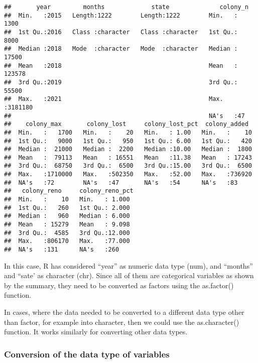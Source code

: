\documentclass[
]{article}
\newenvironment{Shaded}{\begin{snugshade}}{\end{snugshade}}
\newcommand{\FunctionTok}[1]{\textcolor[rgb]{0.13,0.29,0.53}{\textbf{#1}}}
\newcommand{\NormalTok}[1]{#1}
\newcommand{\OtherTok}[1]{\textcolor[rgb]{0.56,0.35,0.01}{#1}}
\newcommand{\SpecialCharTok}[1]{\textcolor[rgb]{0.81,0.36,0.00}{\textbf{#1}}}
\begin{document}
\begin{verbatim}
##       year         months             state              colony_n      
##  Min.   :2015   Length:1222        Length:1222        Min.   :   1300  
##  1st Qu.:2016   Class :character   Class :character   1st Qu.:   8000  
##  Median :2018   Mode  :character   Mode  :character   Median :  17500  
##  Mean   :2018                                         Mean   : 123578  
##  3rd Qu.:2019                                         3rd Qu.:  55500  
##  Max.   :2021                                         Max.   :3181180  
##                                                       NA's   :47       
##    colony_max       colony_lost     colony_lost_pct  colony_added   
##  Min.   :   1700   Min.   :    20   Min.   : 1.00   Min.   :    10  
##  1st Qu.:   9000   1st Qu.:   950   1st Qu.: 6.00   1st Qu.:   420  
##  Median :  21000   Median :  2200   Median :10.00   Median :  1800  
##  Mean   :  79113   Mean   : 16551   Mean   :11.38   Mean   : 17243  
##  3rd Qu.:  68750   3rd Qu.:  6500   3rd Qu.:15.00   3rd Qu.:  6500  
##  Max.   :1710000   Max.   :502350   Max.   :52.00   Max.   :736920  
##  NA's   :72        NA's   :47       NA's   :54      NA's   :83      
##   colony_reno     colony_reno_pct 
##  Min.   :    10   Min.   : 1.000  
##  1st Qu.:   260   1st Qu.: 2.000  
##  Median :   960   Median : 6.000  
##  Mean   : 15279   Mean   : 9.098  
##  3rd Qu.:  4585   3rd Qu.:12.000  
##  Max.   :806170   Max.   :77.000  
##  NA's   :131      NA's   :260
\end{verbatim}

In this case, R has considered ``year'' as numeric data type (num), and
``months'' and ``sate' as character (chr). Since all of them are
categorical variables as shown by the summary, they need to be converted
as factors using the as.factor() function.

In cases, where the data needed to be converted to a different data type
other than factor, for example into character, then we could use the
as.character() function. It works similarly for converting other data
types.

\subsubsection{Conversion of the data type of
variables}\label{conversion-of-the-data-type-of-variables}

\begin{Shaded}
\end{Shaded}
\end{document}

